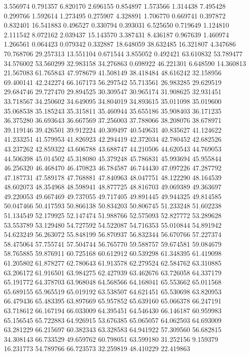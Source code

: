 3.556974
0.791357
6.820170
2.696155
0.854897
1.573566
1.314438
7.495428
0.299766
1.592614
1.273495
0.275907
4.328891
1.706770
0.669741
0.397872
0.832401
16.541883
0.496527
0.330794
0.393031
6.525650
0.719649
1.124810
2.111542
8.072162
2.039437
15.143570
3.387431
8.436187
0.967639
1.460974
1.266561
0.064423
0.079342
0.332887
18.648059
38.632485
16.321807
4.347686
70.768706
29.257313
13.551104
0.671544
3.855052
0.492421
63.610832
53.789477
34.576002
53.560299
32.983158
34.276863
0.698922
46.221301
6.648590
14.360813
21.567083
61.765843
47.978679
41.508149
38.418484
48.616242
32.158956
69.400141
42.242274
66.167173
56.297542
55.713561
26.983285
29.629519
29.684746
29.727470
29.894525
30.309547
30.965174
31.908625
32.931451
33.718567
34.250602
34.649095
34.804019
34.893615
35.011098
35.019600
35.068538
35.185243
35.315811
35.460944
35.655186
35.908403
36.171235
36.375280
36.693643
36.667569
37.256003
37.788066
38.208076
38.678971
39.119146
39.426501
39.912224
40.309497
40.549631
40.835627
41.124622
41.233251
41.579953
41.826923
42.294419
42.372034
42.780452
42.682526
43.237262
42.859322
43.606788
43.688747
44.210506
44.620543
44.769053
44.506398
45.014502
45.318080
45.379248
45.786831
45.993694
45.955844
46.256320
46.468470
46.470823
46.784587
46.744430
47.097226
47.287792
47.187731
47.589178
47.768881
47.840963
48.047751
48.122290
48.164539
48.602073
48.354968
48.598941
48.877725
48.816703
49.069389
49.363697
49.220053
49.667469
49.737055
49.717405
49.891445
49.944325
49.814585
50.047466
50.417593
50.866138
50.834203
50.806745
51.233248
51.602238
51.134549
52.179925
52.147474
51.988766
52.575093
52.827772
53.289628
53.553789
53.129480
54.727592
54.522087
54.716353
55.010844
54.891942
54.623249
56.263072
55.848199
56.870937
56.832344
56.670766
57.227374
58.475064
57.755741
57.504744
56.765770
59.588757
59.674581
59.084679
58.765885
59.876911
60.725168
60.612912
60.539298
61.348395
61.419098
61.205802
61.878277
62.780643
61.913578
62.279524
62.584762
63.310885
63.206172
61.916501
63.984275
62.427939
63.462676
63.726058
64.337179
65.191772
64.378703
63.968048
64.568566
64.168041
65.553662
65.011568
65.689155
65.965519
65.019192
63.538507
64.621451
65.530698
63.820953
66.479436
65.483395
63.897669
65.957852
65.639160
65.066378
66.247191
63.718612
66.167194
66.033009
64.395451
64.546430
66.146187
60.959983
65.156545
65.722883
64.926915
53.676385
65.065057
64.062503
64.693009
63.281229
66.215697
60.382343
63.328583
64.941922
57.309560
56.682815
34.308143
66.733529
49.659762
60.798051
63.599180
31.252156
9.159379
16.231773
54.789766
66.723573
32.259819
48.410229
22.419863
